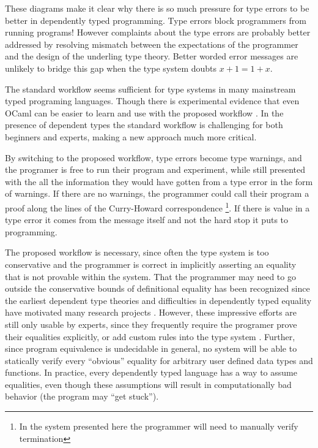 These diagrams make it clear why there is so much pressure for type
errors to be better in dependently typed programming\cite{eremondi2019framework}.
Type errors block programmers from running programs! However complaints
about the type errors are probably better addressed by resolving mismatch
between the expectations of the programmer and the design of the underling
type theory. Better worded error messages are unlikely to bridge this
gap when the type system doubts $x+1=1+x$.

The standard workflow seems sufficient for type systems in many mainstream
typed programing languages. Though there is experimental evidence
that even OCaml can be easier to learn and use with the proposed workflow
\cite{10.1145/2951913.2951915}. In the presence of dependent types
the standard workflow is challenging for both beginners and experts,
making a new approach much more critical. 


By switching to the proposed workflow, type errors become type warnings,
and the programer is free to run their program and experiment, while
still presented with the all the information they would have gotten
from a type error in the form of warnings. If there are no warnings,
the programmer could call their program a proof along the lines of
the Curry-Howard correspondence  \footnote{In the system presented here the programmer will need to manually
verify termination}. If there is value in a type error it comes from the message itself
and not the hard stop it puts to programming.

The proposed workflow is necessary, since often the type system is
too conservative and the programmer is correct in implicitly asserting
an equality that is not provable within the system. That the programmer
may need to go outside the conservative bounds of definitional equality
has been recognized since the earliest dependent type theories \cite{Martin-Lof-1972}
and difficulties in dependently typed equality have motivated many
research projects \cite{HoTTbook,sjoberg2015programming,cockx2021taming}.
However, these impressive efforts are still only usable by experts,
since they frequently require the programer prove their equalities
explicitly\cite{HoTTbook,sjoberg2015programming}, or add custom rules
into the type system \cite{cockx2021taming}. Further, since program
equivalence is undecidable in general, no system will be able to statically
verify every ``obvious'' equality for arbitrary user defined data
types and functions. In practice, every dependently typed language
has a way to assume equalities, even though these assumptions will
result in computationally bad behavior (the program may ``get stuck'').


